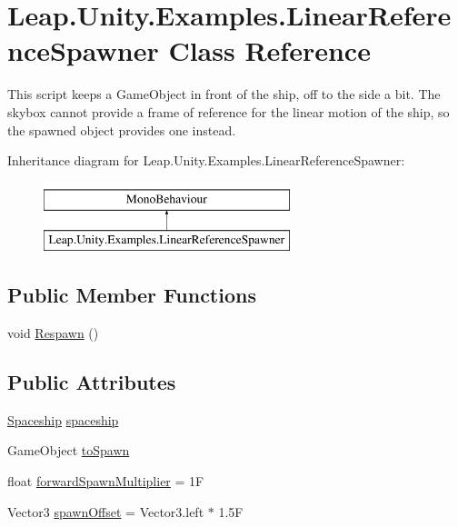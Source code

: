\hypertarget{class_leap_1_1_unity_1_1_examples_1_1_linear_reference_spawner}{}\section{Leap.\+Unity.\+Examples.\+Linear\+Reference\+Spawner Class Reference}
\label{class_leap_1_1_unity_1_1_examples_1_1_linear_reference_spawner}


This script keeps a Game\+Object in front of the ship, off to the side a bit. The skybox cannot provide a frame of reference for the linear motion of the ship, so the spawned object provides one instead.  


Inheritance diagram for Leap.\+Unity.\+Examples.\+Linear\+Reference\+Spawner\+:\begin{figure}[H]
\begin{center}
\leavevmode
\includegraphics[height=2.000000cm]{class_leap_1_1_unity_1_1_examples_1_1_linear_reference_spawner}
\end{center}
\end{figure}
\subsection*{Public Member Functions}
\begin{DoxyCompactItemize}
\item 
void \mbox{\hyperlink{class_leap_1_1_unity_1_1_examples_1_1_linear_reference_spawner_a84df0998436c0604d704a3e9c1b9ac97}{Respawn}} ()
\end{DoxyCompactItemize}
\subsection*{Public Attributes}
\begin{DoxyCompactItemize}
\item 
\mbox{\hyperlink{class_leap_1_1_unity_1_1_examples_1_1_spaceship}{Spaceship}} \mbox{\hyperlink{class_leap_1_1_unity_1_1_examples_1_1_linear_reference_spawner_a9a7bbad212634ab180d50bd198d59de8}{spaceship}}
\item 
Game\+Object \mbox{\hyperlink{class_leap_1_1_unity_1_1_examples_1_1_linear_reference_spawner_adea96f55dd50f93faf4e312f407e42ad}{to\+Spawn}}
\item 
float \mbox{\hyperlink{class_leap_1_1_unity_1_1_examples_1_1_linear_reference_spawner_ac277cb8c99897a41ab292e97cba3e425}{forward\+Spawn\+Multiplier}} = 1F
\item 
Vector3 \mbox{\hyperlink{class_leap_1_1_unity_1_1_examples_1_1_linear_reference_spawner_a9c641cf64a9807193b76358aacd37820}{spawn\+Offset}} = Vector3.\+left $\ast$ 1.\+5F
\end{DoxyCompactItemize}


